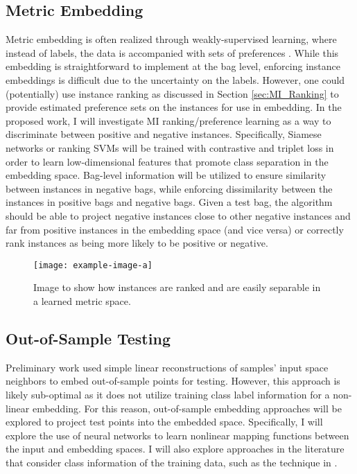 \subsection{Metric Embedding}
Metric embedding is often realized through weakly-supervised learning, where instead of labels, the data is accompanied with sets of preferences \citep{Hermans2017DefenseTripletLoss,Koch2015SiameseNetworks,Schroff2015FaceNet}. While this embedding is straightforward to implement at the bag level, enforcing instance embeddings is difficult due to the uncertainty on the labels.  However, one could (potentially) use instance ranking as discussed in Section \ref{sec:MI_Ranking} to provide estimated preference sets on the instances for use in embedding.  In the proposed work, I will investigate MI ranking/preference learning as a way to discriminate between positive and negative instances.  Specifically, Siamese networks or ranking SVMs will be trained with contrastive and triplet loss in order to learn low-dimensional features that promote class separation in the embedding space.  Bag-level information will be utilized to ensure similarity between instances in negative bags, while enforcing dissimilarity between the instances in positive bags and negative bags.  Given a test bag, the algorithm should be able to project negative instances close to other negative instances and far from positive instances in the embedding space (and vice versa) or correctly rank instances as being more likely to be positive or negative.

\begin{center}
	\begin{figure*}[h]
		\centering
		\texttt{[image: example-image-a]}
		\caption[Proposed Metric Embedding]{Image to show how instances are ranked and are easily separable in a learned metric space.}
		\label{fig:proposed_metric_embedding}
	\end{figure*}
\end{center}

\subsection{Out-of-Sample Testing}
Preliminary work used simple linear reconstructions of  samples' input space neighbors to embed out-of-sample points for testing.  However, this approach is likely sub-optimal as it does not utilize training class label information for a non-linear embedding.  For this reason, out-of-sample embedding approaches will be explored to project test points into the embedded space.  Specifically, I will explore the use of neural networks to learn nonlinear mapping functions between the input and embedding spaces.  I will also explore  approaches in the literature that consider class information of the training data, such as the technique in \citep{Vural2016OutOfSampleSupManifoldLearning}. 

